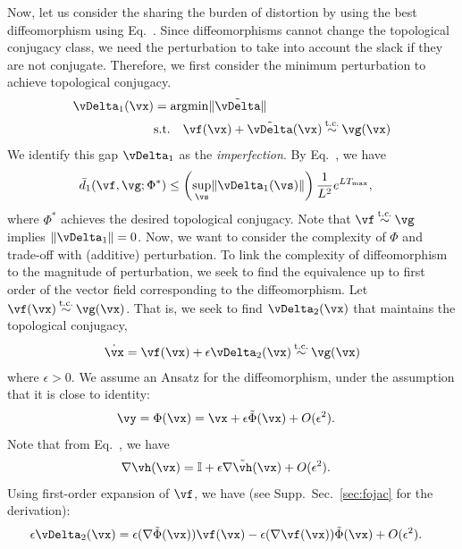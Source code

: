\documentclass{article}
\theoremstyle{definition} \newtheorem{definition}{Definition}  \newtheorem{example}{Example}
\theoremstyle{remark} \newtheorem{remark}{Remark}
\renewcommand{\eqref}{Eq.~\originaleqref}
\newcounter{ct}
\DeclareMathOperator*{\argmin}{\rm argmin}
\DeclarePairedDelimiter{\norm}{\lVert}{\rVert}
\newcommand{\tconju}{\mathbin{\overset{\text{t.c.}}{\sim}}}
\newcommand{\identity}{\ensuremath{\mathbb{I}}}
\newcommand{\homeo}{\Phi} %
\begin{document}
Now, let us consider the sharing the burden of distortion by using the best diffeomorphism using \eqref{eq:ed1}.
Since diffeomorphisms cannot change the topological conjugacy class, we need the perturbation to take into account the slack if they are not conjugate.
Therefore, we first consider the minimum perturbation to achieve topological conjugacy.
\begin{align}
    \vDelta_1(\vx) &= \argmin \norm{\tilde \vDelta}
    \label{eq:d1:min}
    \\
    & \text{s.t.} \quad
    \vf(\vx) + \tilde \vDelta(\vx)
    \tconju
    \vg(\vx)
    \label{eq:d1:tc}
\end{align}
We identify this gap $\vDelta_1$ as the \emph{imperfection}.
By \eqref{eq:d0bound}, we have
\begin{align}
    \bar{d}_1(\vf, \vg; \homeo^\ast)
	&\leq
	\left(\sup_\vs \norm{\vDelta_1(\vs)}\right) \frac{1}{L^2} e^{LT_{\text{max}}},
\end{align}
where $\homeo^\ast$ achieves the desired topological conjugacy.
Note that $\vf \tconju \vg$ implies $\norm{\vDelta_1} = 0$.
Now, we want to consider the complexity of $\homeo$ and trade-off with (additive) perturbation.
To link the complexity of diffeomorphism to the magnitude of perturbation, we seek to find the equivalence up to first order of the vector field corresponding to the diffeomorphism.
Let
$
\vf(\vx)
    \tconju
\vg(\vx)
$.
That is, we seek to find $\vDelta_2(\vx)$ that maintains the topological conjugacy,
\begin{align}
    \dot\vx = \vf(\vx) + \epsilon \vDelta_2(\vx)
    \tconju
    \vg(\vx)
    \label{eq:pareto:tc}
\end{align}
where $\epsilon > 0$.
We assume an Ansatz for the diffeomorphism, under the assumption that it is close to identity:
\begin{align}\label{eq:h:ansatz}
    \vy &= \homeo(\vx) = \vx + \epsilon \tilde\homeo(\vx) + O(\epsilon^2).
\end{align}
Note that from \eqref{eq:h:ansatz}, we have
\begin{align}
    \nabla\vh(\vx) &= \identity + \epsilon\nabla\tilde\vh(\vx) + O(\epsilon^2).
\end{align}
Using first-order expansion of $\vf$, we have (see Supp.~Sec.~\ref{sec:fojac} for the derivation):
\begin{align}
    \epsilon \vDelta_2(\vx) &=
	\epsilon (\nabla\tilde\homeo(\vx)) \vf(\vx)
	-
	\epsilon (\nabla\vf(\vx)) \tilde\homeo(\vx)
	+ O(\epsilon^2).
\end{align}
\end{document}
